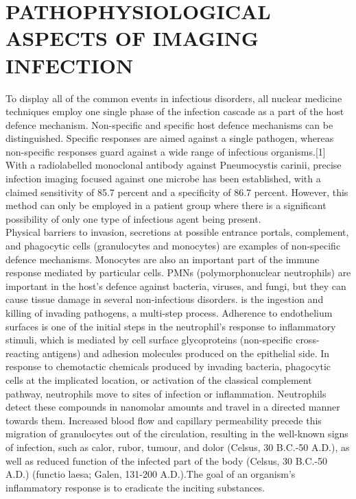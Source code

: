 \documentclass[12pt]{article}
\begin{document}
\section*{PATHOPHYSIOLOGICAL ASPECTS OF IMAGING INFECTION }
To display all of the common events in infectious disorders, all nuclear medicine techniques employ one single phase of the infection cascade as a part of the host defence mechanism. Non-specific and specific host defence mechanisms can be distinguished. Specific responses are aimed against a single pathogen, whereas non-specific responses guard against a wide range of infectious organisms.[1]
\\With a radiolabelled monoclonal antibody against Pneumocystis carinii, precise infection imaging focused against one microbe has been established, with a claimed sensitivity of 85.7 percent and a specificity of 86.7 percent. However, this method can only be employed in a patient group where there is a significant possibility of only one type of infectious agent being present.
\\Physical barriers to invasion, secretions at possible entrance portals, complement, and phagocytic cells (granulocytes and monocytes) are examples of non-specific defence mechanisms. Monocytes are also an important part of the immune response mediated by particular cells. PMNs (polymorphonuclear neutrophils) are important in the host's defence against bacteria, viruses, and fungi, but they can cause tissue damage in several non-infectious disorders. is the ingestion and killing of invading pathogens, a multi-step process. Adherence to endothelium surfaces is one of the initial steps in the neutrophil's response to inflammatory stimuli, which is mediated by cell surface glycoproteins (non-specific cross-reacting antigens) and adhesion molecules produced on the epithelial side. In response to chemotactic chemicals produced by invading bacteria, phagocytic cells at the implicated location, or activation of the classical complement pathway, neutrophils move to sites of infection or inflammation. Neutrophils detect these compounds in nanomolar amounts and travel in a directed manner towards them. Increased blood flow and capillary permeability precede this migration of granulocytes out of the circulation, resulting in the well-known signs of infection, such as calor, rubor, tumour, and dolor (Celsus, 30 B.C.-50 A.D.), as well as reduced function of the infected part of the body (Celsus, 30 B.C.-50 A.D.) (functio laesa; Galen, 131-200 A.D.).The goal of an organism's inflammatory response is to eradicate the inciting substances.
\end{document}
